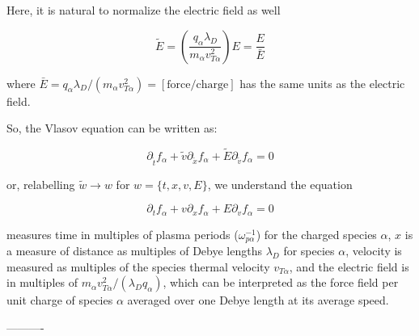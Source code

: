 Here, it is natural to normalize the electric field as well 

$$\tilde{E} = \left(\frac{q_{\alpha}\lambda_D}{m_{\alpha}v_{T\alpha}^2}\right) E = \frac{E}{\bar{E}}$$

where $\bar{E} = q_{\alpha}\lambda_D / (m_{\alpha}v_{T\alpha}^2) = \mathrm{[force / charge]}$ has the same units as the electric field.

So, the Vlasov equation can be written as:

$$\partial_{\tilde{t}} f_{\alpha} + \tilde{v}\partial_{\tilde{x}}f_{\alpha} + \tilde{E} \partial_{\tilde{v}} f_{\alpha} = 0 $$

or, relabelling $\tilde{w} \rightarrow w$ for $w = \{t,x,v,E\}$, we understand the equation

$$\partial_t f_{\alpha} + v\partial_xf_{\alpha} + E \partial_v f_{\alpha} = 0 $$

measures time in multiples of plasma periods ($\omega_{p\alpha}^{-1}$) for the charged species $\alpha$, $x$ is a measure of distance as multiples of Debye lengths $\lambda_D$ for species $\alpha$, velocity is measured as multiples of the species thermal velocity $v_{T\alpha}$, and the electric field is in multiples of $m_{\alpha}v_{T\alpha}^2 / (\lambda_D q_{\alpha})$, which can be interpreted as the force field per unit charge of species $\alpha$ averaged over one Debye length at its average speed.



----------

























